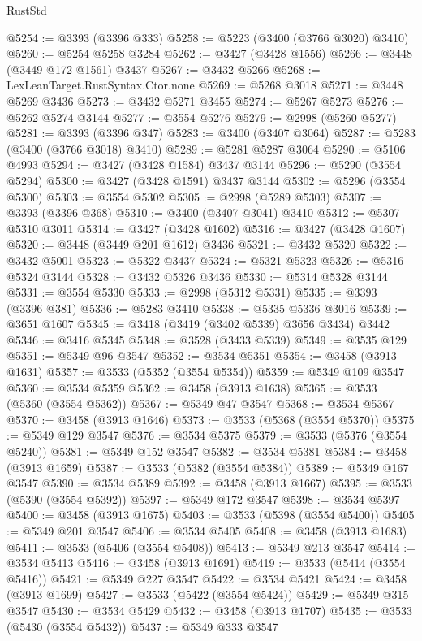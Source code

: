 \begin{lexlean}{RustStd}
\begin{coremodule}
@5254 := @3393 (@3396 @333)
@5258 := @5223 (@3400 (@3766 @3020) @3410)
@5260 := @5254 @5258 @3284
@5262 := @3427 (@3428 @1556)
@5266 := @3448 (@3449 @172 @1561) @3437
@5267 := @3432 @5266
@5268 := LexLeanTarget.RustSyntax.Ctor.none
@5269 := @5268 @3018
@5271 := @3448 @5269 @3436
@5273 := @3432 @5271 @3455
@5274 := @5267 @5273
@5276 := @5262 @5274 @3144
@5277 := @3554 @5276
@5279 := @2998 (@5260 @5277)
@5281 := @3393 (@3396 @347)
@5283 := @3400 (@3407 @3064)
@5287 := @5283 (@3400 (@3766 @3018) @3410)
@5289 := @5281 @5287 @3064
@5290 := @5106 @4993
@5294 := @3427 (@3428 @1584) @3437 @3144
@5296 := @5290 (@3554 @5294)
@5300 := @3427 (@3428 @1591) @3437 @3144
@5302 := @5296 (@3554 @5300)
@5303 := @3554 @5302
@5305 := @2998 (@5289 @5303)
@5307 := @3393 (@3396 @368)
@5310 := @3400 (@3407 @3041) @3410
@5312 := @5307 @5310 @3011
@5314 := @3427 (@3428 @1602)
@5316 := @3427 (@3428 @1607)
@5320 := @3448 (@3449 @201 @1612) @3436
@5321 := @3432 @5320
@5322 := @3432 @5001
@5323 := @5322 @3437
@5324 := @5321 @5323
@5326 := @5316 @5324 @3144
@5328 := @3432 @5326 @3436
@5330 := @5314 @5328 @3144
@5331 := @3554 @5330
@5333 := @2998 (@5312 @5331)
@5335 := @3393 (@3396 @381)
@5336 := @5283 @3410
@5338 := @5335 @5336 @3016
@5339 := @3651 @1607
@5345 := @3418 (@3419 (@3402 @5339) @3656 @3434) @3442
@5346 := @3416 @5345
@5348 := @3528 (@3433 @5339)
@5349 := @3535 @129
@5351 := @5349 @96 @3547
@5352 := @3534 @5351
@5354 := @3458 (@3913 @1631)
@5357 := @3533 (@5352 (@3554 @5354))
@5359 := @5349 @109 @3547
@5360 := @3534 @5359
@5362 := @3458 (@3913 @1638)
@5365 := @3533 (@5360 (@3554 @5362))
@5367 := @5349 @47 @3547
@5368 := @3534 @5367
@5370 := @3458 (@3913 @1646)
@5373 := @3533 (@5368 (@3554 @5370))
@5375 := @5349 @129 @3547
@5376 := @3534 @5375
@5379 := @3533 (@5376 (@3554 @5240))
@5381 := @5349 @152 @3547
@5382 := @3534 @5381
@5384 := @3458 (@3913 @1659)
@5387 := @3533 (@5382 (@3554 @5384))
@5389 := @5349 @167 @3547
@5390 := @3534 @5389
@5392 := @3458 (@3913 @1667)
@5395 := @3533 (@5390 (@3554 @5392))
@5397 := @5349 @172 @3547
@5398 := @3534 @5397
@5400 := @3458 (@3913 @1675)
@5403 := @3533 (@5398 (@3554 @5400))
@5405 := @5349 @201 @3547
@5406 := @3534 @5405
@5408 := @3458 (@3913 @1683)
@5411 := @3533 (@5406 (@3554 @5408))
@5413 := @5349 @213 @3547
@5414 := @3534 @5413
@5416 := @3458 (@3913 @1691)
@5419 := @3533 (@5414 (@3554 @5416))
@5421 := @5349 @227 @3547
@5422 := @3534 @5421
@5424 := @3458 (@3913 @1699)
@5427 := @3533 (@5422 (@3554 @5424))
@5429 := @5349 @315 @3547
@5430 := @3534 @5429
@5432 := @3458 (@3913 @1707)
@5435 := @3533 (@5430 (@3554 @5432))
@5437 := @5349 @333 @3547

\end{coremodule}
\end{lexlean}
